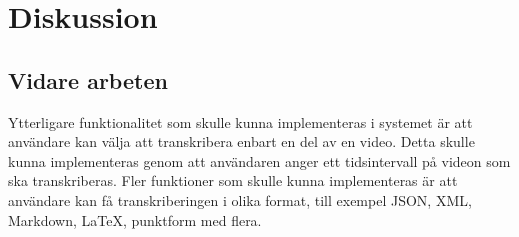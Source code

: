 \chapter{Diskussion}

\section{Vidare arbeten}
Ytterligare funktionalitet som skulle kunna implementeras i systemet är att
användare kan välja att transkribera enbart en del av en video. Detta skulle
kunna implementeras genom att användaren anger ett tidsintervall på videon som
ska transkriberas. Fler funktioner som skulle kunna implementeras är att
användare kan få transkriberingen i olika format, till exempel JSON, XML,
Markdown, LaTeX, punktform med flera.